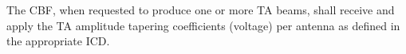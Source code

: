 The CBF, when requested to produce one or more TA beams, shall receive and
apply the TA amplitude tapering coefficients (voltage) per antenna as defined
in the appropriate ICD.
